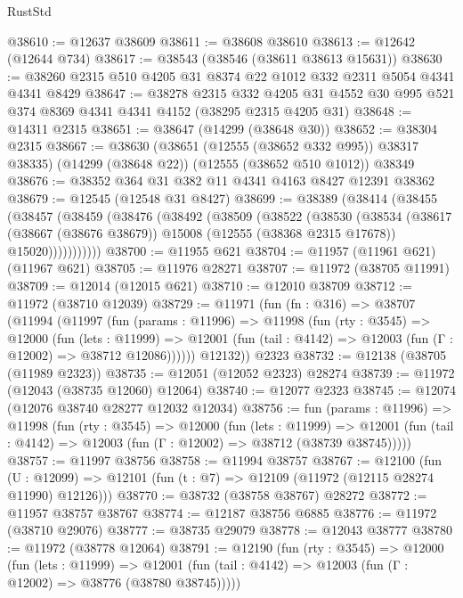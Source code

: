 \begin{lexlean}{RustStd}
\begin{coremodule}
@38610 := @12637 @38609
@38611 := @38608 @38610
@38613 := @12642 (@12644 @734)
@38617 := @38543 (@38546 (@38611 @38613 @15631))
@38630 := @38260 @2315 @510 @4205 @31 @8374 @22 @1012 @332 @2311 @5054 @4341 @4341 @8429
@38647 := @38278
    @2315
    @332
    @4205
    @31
    @4552
    @30
    @995
    @521
    @374
    @8369
    @4341
    @4341
    @4152
    (@38295 @2315 @4205 @31)
@38648 := @14311 @2315
@38651 := @38647 (@14299 (@38648 @30))
@38652 := @38304 @2315
@38667 := @38630
    (@38651 (@12555 (@38652 @332 @995)) @38317 @38335)
    (@14299 (@38648 @22))
    (@12555 (@38652 @510 @1012))
    @38349
@38676 := @38352 @364 @31 @382 @11 @4341 @4163 @8427 @12391 @38362
@38679 := @12545 (@12548 @31 @8427)
@38699 := @38389
    (@38414
      (@38455
        (@38457
          (@38459
            (@38476
              (@38492
                (@38509
                  (@38522
                    (@38530
                      (@38534
                        (@38617
                          (@38667 (@38676 @38679))
                          @15008
                          (@12555 (@38368 @2315 @17678))
                          @15020)))))))))))
@38700 := @11955 @621
@38704 := @11957 (@11961 @621) (@11967 @621)
@38705 := @11976 @28271
@38707 := @11972 (@38705 @11991)
@38709 := @12014 (@12015 @621)
@38710 := @12010 @38709
@38712 := @11972 (@38710 @12039)
@38729 := @11971
    (fun (fn : @316) =>
    @38707
      (@11994
        (@11997
          (fun (params : @11996) =>
          @11998
            (fun (rty : @3545) =>
            @12000
              (fun (lets : @11999) =>
              @12001 (fun (tail : @4142) => @12003 (fun (Γ : @12002) => @38712 @12086))))))
        @12132))
    @2323
@38732 := @12138 (@38705 (@11989 @2323))
@38735 := @12051 (@12052 @2323) @28274
@38739 := @11972 (@12043 (@38735 @12060) @12064)
@38740 := @12077 @2323
@38745 := @12074 (@12076 @38740 @28277 @12032 @12034)
@38756 := fun (params : @11996) =>
  @11998
    (fun (rty : @3545) =>
    @12000
      (fun (lets : @11999) =>
      @12001 (fun (tail : @4142) => @12003 (fun (Γ : @12002) => @38712 (@38739 @38745)))))
@38757 := @11997 @38756
@38758 := @11994 @38757
@38767 := @12100
    (fun (U : @12099) => @12101 (fun (t : @7) => @12109 (@11972 (@12115 @28274 @11990) @12126)))
@38770 := @38732 (@38758 @38767) @28272
@38772 := @11957 @38757 @38767
@38774 := @12187 @38756 @6885
@38776 := @11972 (@38710 @29076)
@38777 := @38735 @29079
@38778 := @12043 @38777
@38780 := @11972 (@38778 @12064)
@38791 := @12190
    (fun (rty : @3545) =>
    @12000
      (fun (lets : @11999) =>
      @12001 (fun (tail : @4142) => @12003 (fun (Γ : @12002) => @38776 (@38780 @38745)))))

\end{coremodule}
\end{lexlean}
